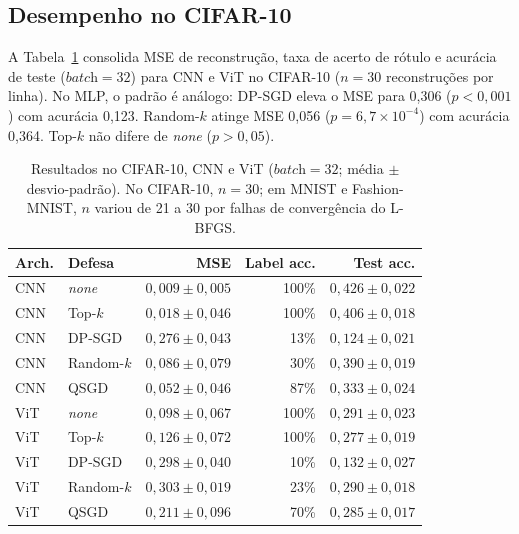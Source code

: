 \documentclass[kdmile,a4paper]{kdmile}
\begin{document}
\subsection{Desempenho no CIFAR-10}

A Tabela~\ref{tab:cifar10} consolida MSE de reconstru\c{c}\~{a}o, taxa de acerto de r\'{o}tulo e acur\'{a}cia de teste ($\textit{batch} = 32$) para CNN e ViT no CIFAR-10 ($n = 30$ reconstru\c{c}\~{o}es por linha). No MLP, o padr\~{a}o \'{e} an\'{a}logo: DP-SGD eleva o MSE para 0,306 ($p < 0{,}001$) com acur\'{a}cia 0,123. Random-$k$ atinge MSE 0,056 ($p = 6{,}7 \times 10^{-4}$) com acur\'{a}cia 0,364. Top-$k$ n\~{a}o difere de \textit{none} ($p > 0{,}05$).

\begin{table}[t]
\centering
\caption{Resultados no CIFAR-10, CNN e ViT ($\textit{batch} = 32$; m\'{e}dia $\pm$ desvio-padr\~{a}o). No CIFAR-10, $n = 30$; em MNIST e Fashion-MNIST, $n$ variou de 21 a 30 por falhas de converg\^{e}ncia do L-BFGS.}
\label{tab:cifar10}
\footnotesize
\begin{tabular}{llrrr}
\toprule
\textbf{Arch.} & \textbf{Defesa} & \textbf{MSE} & \textbf{Label acc.} & \textbf{Test acc.} \\
\midrule
CNN  & \textit{none}    & $0{,}009 \pm 0{,}005$ & 100\% & $0{,}426 \pm 0{,}022$ \\
CNN  & Top-$k$         & $0{,}018 \pm 0{,}046$ & 100\% & $0{,}406 \pm 0{,}018$ \\
CNN  & DP-SGD          & $0{,}276 \pm 0{,}043$ & 13\%  & $0{,}124 \pm 0{,}021$ \\
CNN  & Random-$k$      & $0{,}086 \pm 0{,}079$ & 30\%  & $0{,}390 \pm 0{,}019$ \\
CNN  & QSGD            & $0{,}052 \pm 0{,}046$ & 87\%  & $0{,}333 \pm 0{,}024$ \\
\midrule
ViT  & \textit{none}    & $0{,}098 \pm 0{,}067$ & 100\% & $0{,}291 \pm 0{,}023$ \\
ViT  & Top-$k$         & $0{,}126 \pm 0{,}072$ & 100\% & $0{,}277 \pm 0{,}019$ \\
ViT  & DP-SGD          & $0{,}298 \pm 0{,}040$ & 10\%  & $0{,}132 \pm 0{,}027$ \\
ViT  & Random-$k$      & $0{,}303 \pm 0{,}019$ & 23\%  & $0{,}290 \pm 0{,}018$ \\
ViT  & QSGD            & $0{,}211 \pm 0{,}096$ & 70\%  & $0{,}285 \pm 0{,}017$ \\
\bottomrule
\end{tabular}
\end{table}
\end{document}
